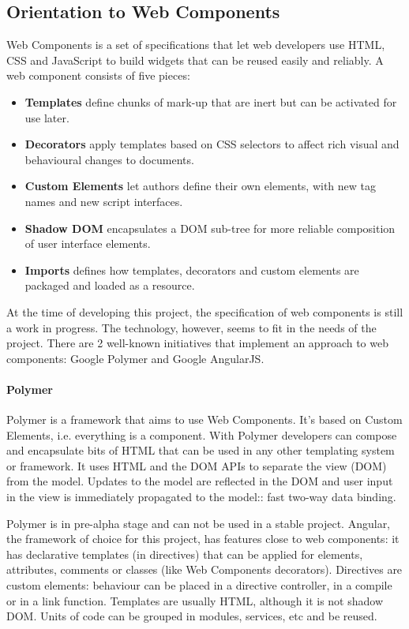 \subsection{Orientation to Web Components}
Web Components is a set of specifications that let web developers use \ac{HTML}, \ac{CSS} and JavaScript to build widgets that can be reused easily and reliably.
A web component consists of five pieces\cite{W3CComponents:2013}:
\begin{itemize}
    \item \textbf{Templates} define chunks of mark-up that are inert but can be activated for use later.
    \item \textbf{Decorators} apply templates based on CSS selectors to affect rich visual and behavioural changes to documents.
    \item \textbf{Custom Elements} let authors define their own elements, with new tag names and new script interfaces.
    \item \textbf{Shadow DOM}  encapsulates a DOM sub-tree for more reliable composition of user interface elements.
    \item \textbf{Imports} defines how templates, decorators and custom elements are packaged and loaded as a resource.
\end{itemize}

At the time of developing this project, the specification of web components is still a work in progress.
The technology, however, seems to fit in the needs of the project.
There are 2 well-known initiatives that implement an approach to web components: Google Polymer and Google AngularJS.

\paragraph{Polymer} Polymer is a framework that aims to use Web Components. 
It's based on Custom Elements, i.e. everything is a component.
With Polymer developers can compose and encapsulate bits of HTML that can be used in any other templating system or framework.
It uses \ac{HTML} and the \ac{DOM} \acp{API} to separate the view (\ac{DOM}) from the model. 
Updates to the model are reflected in the \ac{DOM} and user input in the view is immediately propagated to the model:: fast two-way data binding.

Polymer is in pre-alpha stage and can not be used in a stable project.
Angular, the framework of choice for this project, has features close to web components: it has declarative templates (in directives) that can be applied for elements, attributes, comments or classes (like Web Components decorators).
Directives are custom elements: behaviour can be placed in a directive controller, in a compile or in a link function.
Templates are usually \ac{HTML}, although it is not shadow \ac{DOM}.
Units of code can be grouped in modules, services, etc and be reused.



